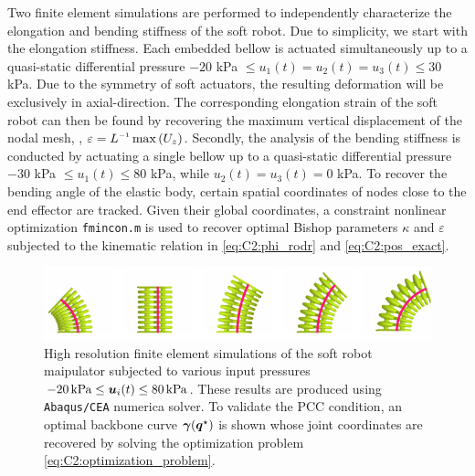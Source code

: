 Two finite element simulations are performed to {independently characterize the elongation and bending stiffness of the soft robot. Due to simplicity, we start with the elongation stiffness}. Each embedded bellow is actuated simultaneously up to a quasi-static differential pressure $-20$ kPa $\le u_1(t) = u_2(t) = u_3(t) \le 30$ kPa. Due to the symmetry of soft actuators, the resulting deformation will be exclusively in axial-direction. The corresponding elongation strain of the soft robot can then be found by recovering the maximum vertical displacement of the nodal mesh, \ie, $\varepsilon = L\inv\max \left( {U}_z \right)$. Secondly, the analysis of the bending stiffness is conducted by actuating a single bellow up to a quasi-static differential pressure $-30$ kPa $\le u_1(t) \le  80$ kPa, while $u_2(t) = u_3(t) = 0$ kPa. To recover the bending angle of the elastic body, certain spatial coordinates of nodes close to the end effector are tracked. Given their global coordinates, a constraint nonlinear optimization \texttt{fmincon.m} is used to recover optimal Bishop parameters $\kappa$ and $\varepsilon
$ subjected to the kinematic relation in \eqref{eq:C2:phi_rodr} and \eqref{eq:C2:pos_exact}.
%
\begin{figure}[!t]
  \centering
  \includegraphics*{./pdf/thesis-figure-4-6.pdf}
  \vspace{-0.2cm}
  \caption{ High resolution finite element simulations of the soft robot maipulator   subjected to various input pressures $-20 \,\si{\kilo \pascal} \le {\boldsymbol{u}}_i(t) \le 80 \,\si{\kilo \pascal}$.  These results are produced using \texttt{Abaqus/CEA} numerica solver.  To validate the PCC condition, an optimal backbone curve ${\boldsymbol{\gamma}}({\boldsymbol{q}}^\star)$ is shown  whose joint coordinates are recovered by solving the optimization problem \eqref{eq:C2:optimization_problem}.}
  \vspace{-0.1cm}
  \label{fig:C2:fem_analysis}
\end{figure}
%
